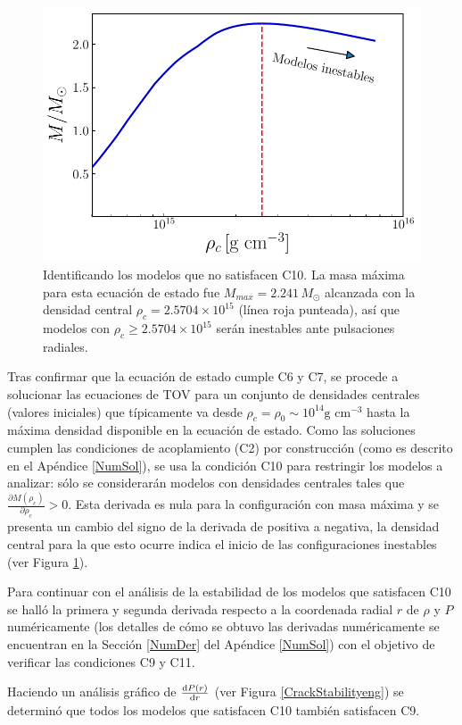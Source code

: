\begin{figure}[H]
    \centering
    \includegraphics[width=0.7\linewidth]{figures/Mrhorel_eng.pdf}
    \caption{Identificando los modelos que no satisfacen C10. La masa máxima para esta ecuación de estado fue $M_{max}=2.241\,M_{\odot}$ alcanzada con la densidad central $\rho_c=2.5704 \times 10^{15}$ (línea roja punteada), así que modelos con $\rho_c \geq 2.5704 \times 10^{15}$ serán inestables ante pulsaciones radiales. }
    \label{mrhoeng}
\end{figure}

Tras confirmar que la ecuación de estado cumple C6 y C7, se procede a solucionar las ecuaciones de TOV para un conjunto de densidades centrales (valores iniciales) que típicamente va desde $\rho_c=\rho_0 \sim 10^{14} \text{g cm}^{-3}$ hasta la máxima densidad disponible en la ecuación de estado. Como las soluciones cumplen las condiciones de acoplamiento (C2) por construcción (como es descrito en el Apéndice \ref{NumSol}), se usa la condición C10 para restringir los modelos a analizar: sólo se considerarán modelos con densidades centrales tales que $\frac { \partial M \left( \rho _ { c } \right) } { \partial \rho _ { c } } > 0$. Esta derivada es nula para la configuración con masa máxima y se presenta un cambio del signo de la derivada de positiva a negativa, la densidad central para la que esto ocurre indica el inicio de las configuraciones inestables (ver Figura \ref{mrhoeng}).

Para continuar con el análisis de la estabilidad de los modelos que satisfacen C10 se halló la primera y segunda derivada respecto a la coordenada radial $r$ de $\rho$ y $P$ numéricamente (los detalles de cómo se obtuvo las derivadas numéricamente se encuentran en la Sección \ref{NumDer} del Apéndice \ref{NumSol}) con el objetivo de verificar las condiciones C9 y C11.  

Haciendo un análisis gráfico de $\dv{P(r)}{r} $ (ver Figura \ref{CrackStabilityeng}) se determinó que todos los modelos que satisfacen C10 también satisfacen C9. 
 

